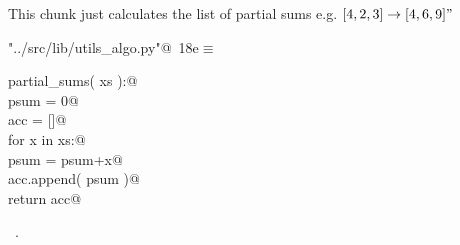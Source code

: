 \documentclass[11.5pt]{report}
\begin{document}
\vspace{-0.8cm}
\newchunk This chunk just calculates the list of partial sums e.g. $[4,2,3] \rightarrow [4,6,9]"$
\begin{flushleft} \small\label{scrap17}\raggedright\small
{} \verb@"../src/lib/utils_algo.py"@\nobreak\ {\footnotesize {18e}}$\equiv$
\vspace{-1ex}
\begin{list}{}{} \item
\mbox{}\verb@def partial_sums( xs ):@\\
\mbox{}\verb@    psum = 0@\\
\mbox{}\verb@    acc = []@\\
\mbox{}\verb@    for x in xs:@\\
\mbox{}\verb@        psum = psum+x@\\
\mbox{}\verb@        acc.append( psum )@\\
\mbox{}\verb@    return acc@\\
\mbox{}\verb@@{\NWsep}
\end{list}
\vspace{-1.5ex}
\footnotesize
\begin{list}{}{\setlength{\itemsep}{-\parsep}\setlength{\itemindent}{-\leftmargin}}
\item \NWtxtFileDefBy\ .

\item{}
\end{list}
\vspace{4ex}
\end{flushleft}
\end{document}
